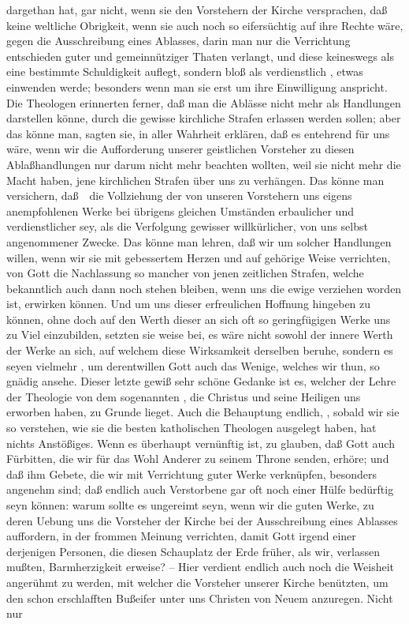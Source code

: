 \begin{RWanm}
dargethan hat, gar nicht, wenn sie den Vorstehern der Kirche versprachen, daß keine weltliche Obrigkeit, wenn sie auch noch so eifersüchtig auf ihre Rechte wäre, gegen die Ausschreibung eines Ablasses, darin man nur die Verrichtung entschieden guter und gemeinnütziger Thaten verlangt, und diese keineswegs als eine bestimmte Schuldigkeit auflegt, sondern bloß als verdienstlich , etwas einwenden werde; besonders wenn man sie erst um ihre Einwilligung anspricht. Die Theologen erinnerten ferner, daß man die Ablässe nicht mehr als Handlungen darstellen könne, durch die gewisse kirchliche Strafen erlassen werden sollen; aber das könne man, sagten sie, in aller Wahrheit erklären, daß es entehrend für uns wäre, wenn wir die Aufforderung unserer geistlichen Vorsteher zu diesen Ablaßhandlungen nur darum nicht mehr beachten wollten, weil sie nicht mehr die Macht haben, jene kirchlichen Strafen über uns zu verhängen. Das könne man versichern, daß~\ die Vollziehung der von unseren Vorstehern uns eigens anempfohlenen Werke bei übrigens gleichen Umständen erbaulicher und verdienstlicher sey, als die Verfolgung gewisser willkürlicher, von uns selbst angenommener Zwecke. Das könne man lehren, daß wir um solcher Handlungen willen, wenn wir sie mit gebessertem Herzen und auf gehörige Weise verrichten, von Gott die Nachlassung so mancher von jenen zeitlichen Strafen, welche bekanntlich auch dann noch stehen bleiben, wenn uns die ewige verziehen worden ist, erwirken können. Und um uns dieser erfreulichen Hoffnung hingeben zu können, ohne doch auf den Werth dieser an sich oft so geringfügigen Werke uns zu Viel einzubilden, setzten sie weise bei, es wäre nicht sowohl der innere Werth der Werke an sich, auf welchem diese Wirksamkeit derselben beruhe, sondern es seyen vielmehr , um derentwillen Gott auch das Wenige, welches wir thun, so gnädig ansehe. Dieser letzte gewiß sehr schöne Gedanke ist es, welcher der Lehre der Theologie von dem sogenannten , die Christus und seine Heiligen uns erworben haben, zu Grunde lieget. Auch die Behauptung endlich, , sobald wir sie so verstehen, wie sie die besten katholischen Theologen ausgelegt haben, hat nichts Anstößiges. Wenn es überhaupt vernünftig ist, zu glauben, daß Gott auch Fürbitten, die wir für das Wohl Anderer zu seinem Throne senden, erhöre; und daß ihm Gebete, die wir mit Verrichtung guter Werke verknüpfen, besonders angenehm sind; daß endlich auch Verstorbene gar oft noch einer Hülfe bedürftig seyn können: warum sollte es ungereimt seyn, wenn wir die guten Werke, zu deren Uebung uns die Vorsteher der Kirche bei der Ausschreibung eines Ablasses auffordern, in der frommen Meinung verrichten, damit Gott irgend einer derjenigen Personen, die diesen Schauplatz der Erde früher, als wir, verlassen mußten, Barmherzigkeit erweise? -- Hier verdient endlich auch noch die Weisheit angerühmt zu werden, mit welcher die Vorsteher unserer Kirche  benützten, um den schon erschlafften Bußeifer unter uns Christen von Neuem anzuregen. Nicht nur 
\end{RWanm}
